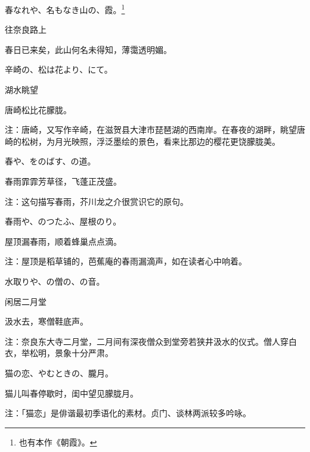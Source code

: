 \begin{haiku}
    {\FH 春なれや、名もなき山の、霞。\footnote{\FT 也有本作《朝霞》。}}

    {\FK 往奈良路上}

    {\FK 春日已来矣，此山何名未得知，薄霭透明媚。}
\end{haiku}

\begin{haiku}
    {\FH 辛崎の、松は花より、にて。}

    {\FK 湖水眺望}

    {\FK 唐崎松比花朦胧。}

    {\FT 注：唐崎，又写作辛崎，在滋贺县大津市琵琶湖的西南岸。在春夜的湖畔，眺望唐崎的松树，为月光映照，浮泛墨绘的景色，看来比那边的樱花更饶朦胧美。}
\end{haiku}

\begin{haiku}
    {\FH 春や、をのばす、の道。}

    {\FK 春雨霏霏芳草径，飞蓬正茂盛。}

    {\FT 注：这句描写春雨，芥川龙之介很赏识它的原句。}
\end{haiku}

\begin{haiku}
    {\FH 春雨や、のつたふ、屋根のり。}

    {\FK 屋顶漏春雨，顺着蜂巢点点滴。}

    {\FT 注：屋顶是稻草铺的，芭蕉庵的春雨漏滴声，如在读者心中响着。}
\end{haiku}

\begin{haiku}
    {\FH 水取りや、の僧の、の音。}

    {\FK 闲居二月堂}

    {\FK 汲水去，寒僧鞋底声。}

    {\FT 注：奈良东大寺二月堂，二月间有深夜僧众到堂旁若狭井汲水的仪式。僧人穿白衣，举松明，景象十分严肃。}
\end{haiku}

\begin{haiku}
    {\FH 猫の恋、やむときの、朧月。}

    {\FK 猫儿叫春停歇时，闺中望见朦胧月。}

    {\FT 注：「猫恋」是俳谐最初季语化的素材。贞门、谈林两派较多吟咏。}
\end{haiku}

